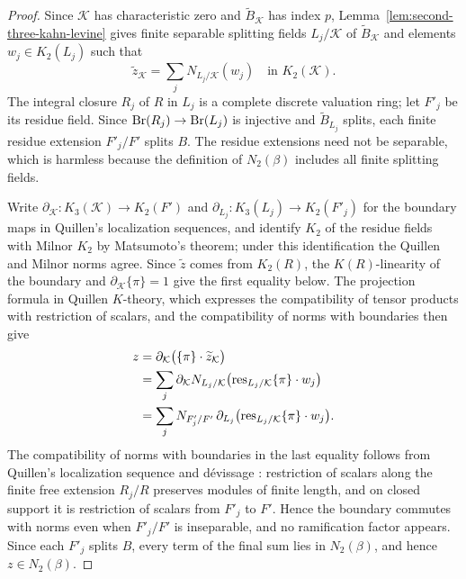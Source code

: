 \begin{proof}
Since $\mathcal K$ has characteristic zero and $\widetilde B_{\mathcal K}$ has index $p$, Lemma~\ref{lem:second-three-kahn-levine} gives finite separable splitting fields $L_j/\mathcal K$ of $\widetilde B_{\mathcal K}$ and elements $w_j\in K_2(L_j)$ such that
\[
 \widetilde z_{\mathcal K}=\sum_jN_{L_j/\mathcal K}(w_j)
    \quad\text{in }K_2(\mathcal K).
\]
The integral closure $R_j$ of $R$ in $L_j$ is a complete discrete valuation ring; let $F'_j$ be its residue field.
Since $\operatorname{Br}(R_j)\to\operatorname{Br}(L_j)$ is injective and $\widetilde B_{L_j}$ splits, each finite residue extension $F'_j/F'$ splits $B$.
The residue extensions need not be separable, which is harmless because the definition of $N_2(\beta)$ includes all finite splitting fields.

Write $\partial_{\mathcal K}\colon K_3(\mathcal K)\to K_2(F')$ and $\partial_{L_j}\colon K_3(L_j)\to K_2(F'_j)$ for the boundary maps in Quillen's localization sequences, and identify $K_2$ of the residue fields with Milnor $K_2$ by Matsumoto's theorem; under this identification the Quillen and Milnor norms agree.
Since $\widetilde z$ comes from $K_2(R)$, the $K(R)$-linearity of the boundary and $\partial_{\mathcal K}\{\pi\}=1$ give the first equality below.
The projection formula in Quillen $K$-theory, which expresses the compatibility of tensor products with restriction of scalars, and the compatibility of norms with boundaries then give
\[
 \begin{aligned}
 z
 &=\partial_{\mathcal K}\bigl(\{\pi\}\cdot\widetilde z_{\mathcal K}\bigr)\\
 &=\sum_j\partial_{\mathcal K}N_{L_j/\mathcal K}
             \bigl(\operatorname{res}_{L_j/\mathcal K}\{\pi\}\cdot w_j\bigr)\\
 &=\sum_jN_{F'_j/F'}\,\partial_{L_j}
             \bigl(\operatorname{res}_{L_j/\mathcal K}\{\pi\}\cdot w_j\bigr).
 \end{aligned}
\]
The compatibility of norms with boundaries in the last equality follows from Quillen's localization sequence and d\'evissage \cite[\S5, Theorems 4 and 5]{QuillenHigher}: restriction of scalars along the finite free extension $R_j/R$ preserves modules of finite length, and on closed support it is restriction of scalars from $F'_j$ to $F'$.
Hence the boundary commutes with norms even when $F'_j/F'$ is inseparable, and no ramification factor appears.
Since each $F'_j$ splits $B$, every term of the final sum lies in $N_2(\beta)$, and hence $z\in N_2(\beta)$.
\end{proof}

